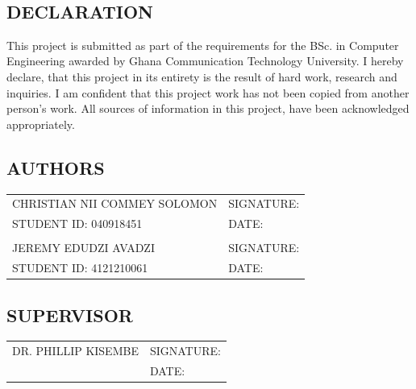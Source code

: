 \documentclass[a4paper,12pt]{article}  %
\begin{document}
\newpage
\
\begin{center}
		\section*{DECLARATION}
      This project is submitted as part of the requirements for the BSc. in Computer Engineering awarded by Ghana Communication Technology University. I hereby declare, that this project in its entirety is the result of hard work, research and inquiries. I am confident that this project work has not been copied from another person’s work. All sources of information in this project, have been acknowledged appropriately.
\end{center}

\vspace{1cm}

\subsection*{AUTHORS}
\begin{tabular}{l l}
      \vspace{1cm}
      CHRISTIAN NII COMMEY SOLOMON & SIGNATURE: \underline{\hspace{5cm}} \\
      \vspace{1cm}
      STUDENT ID: 040918451        & DATE: \underline{\hspace{5cm}}      \\
                                   &                                     \\
      \vspace{1cm}
      JEREMY EDUDZI AVADZI         & SIGNATURE: \underline{\hspace{5cm}} \\
      STUDENT ID: 4121210061       & DATE: \underline{\hspace{5cm}}      \\
\end{tabular}

\vspace{1cm}

\subsection*{SUPERVISOR}
\begin{tabular}{l l}
      \vspace{1cm}
      DR. PHILLIP KISEMBE & SIGNATURE: \underline{\hspace{5cm}} \\
                          & DATE: \underline{\hspace{5cm}}      \\
\end{tabular}
\end{document}
